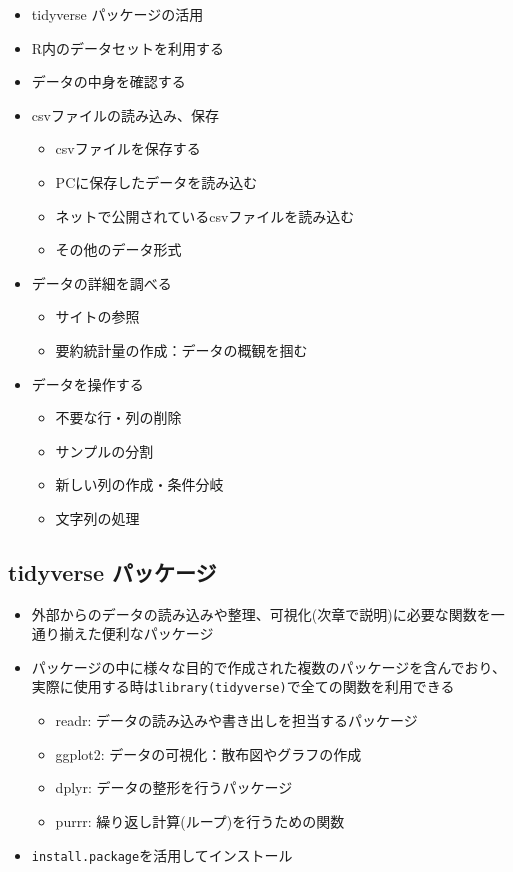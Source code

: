 \documentclass[
]{ltjsarticle}
\providecommand{\tightlist}{%
  \setlength{\itemsep}{0pt}\setlength{\parskip}{0pt}}
\begin{document}
\begin{itemize}
\tightlist
\item
  tidyverse パッケージの活用
\item
  R内のデータセットを利用する
\item
  データの中身を確認する
\item
  csvファイルの読み込み、保存

  \begin{itemize}
  \tightlist
  \item
    csvファイルを保存する
  \item
    PCに保存したデータを読み込む
  \item
    ネットで公開されているcsvファイルを読み込む
  \item
    その他のデータ形式
  \end{itemize}
\item
  データの詳細を調べる

  \begin{itemize}
  \tightlist
  \item
    サイトの参照
  \item
    要約統計量の作成：データの概観を掴む
  \end{itemize}
\item
  データを操作する

  \begin{itemize}
  \tightlist
  \item
    不要な行・列の削除
  \item
    サンプルの分割
  \item
    新しい列の作成・条件分岐
  \item
    文字列の処理
  \end{itemize}
\end{itemize}

\hypertarget{tidyverse-ux30d1ux30c3ux30b1ux30fcux30b8}{%
\subsection{tidyverse
パッケージ}\label{tidyverse-ux30d1ux30c3ux30b1ux30fcux30b8}}

\begin{itemize}
\tightlist
\item
  外部からのデータの読み込みや整理、可視化(次章で説明)に必要な関数を一通り揃えた便利なパッケージ
\item
  パッケージの中に様々な目的で作成された複数のパッケージを含んでおり、実際に使用する時は\texttt{library(tidyverse)}で全ての関数を利用できる

  \begin{itemize}
  \tightlist
  \item
    readr: データの読み込みや書き出しを担当するパッケージ
  \item
    ggplot2: データの可視化：散布図やグラフの作成
  \item
    dplyr: データの整形を行うパッケージ
  \item
    purrr: 繰り返し計算(ループ)を行うための関数
  \end{itemize}
\item
  \texttt{install.package}を活用してインストール
\end{itemize}
\end{document}
